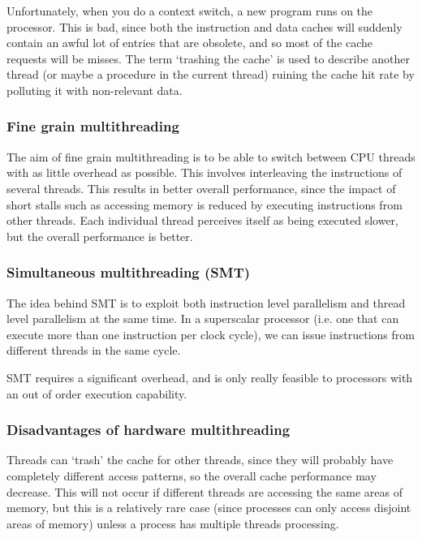 Unfortunately, when you do a context switch, a new program runs on the
processor. This is bad, since both the instruction and data caches will suddenly
contain an awful lot of entries that are obsolete, and so most of the cache
requests will be misses. The term `trashing the cache' is used to describe
another thread (or maybe a procedure in the current thread) ruining the cache
hit rate by polluting it with non-relevant data.

\subsubsection{Fine grain multithreading}

The aim of fine grain multithreading is to be able to switch between CPU threads
with as little overhead as possible. This involves interleaving the instructions
of several threads. This results in better overall performance, since the impact
of short stalls such as accessing memory is reduced by executing instructions
from other threads. Each individual thread perceives itself as being executed
slower, but the overall performance is better.

\subsubsection{Simultaneous multithreading (SMT)}

The idea behind SMT is to exploit both instruction level parallelism and thread
level parallelism at the same time. In a superscalar processor (i.e. one that
can execute more than one instruction per clock cycle), we can issue
instructions from different threads in the same cycle.

SMT requires a significant overhead, and is only really feasible to processors
with an out of order execution capability.

\subsubsection{Disadvantages of hardware multithreading}

Threads can `trash' the cache for other threads, since they will probably have
completely different access patterns, so the overall cache performance may
decrease. This will not occur if different threads are accessing the same areas
of memory, but this is a relatively rare case (since processes can only access
disjoint areas of memory) unless a process has multiple threads processing.

